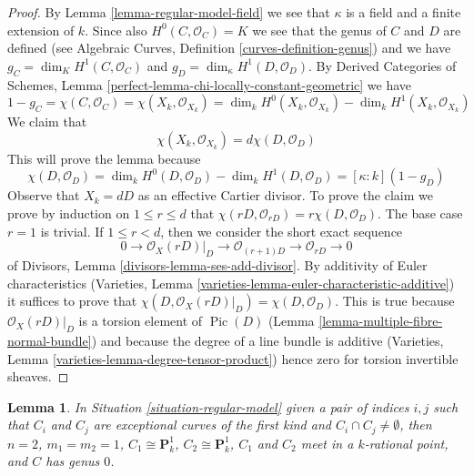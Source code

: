 \documentclass{stacks-project}
\theoremstyle{plain}
\newtheorem{lemma}[subsection]{Lemma}
\theoremstyle{definition}
\theoremstyle{remark}
\numberwithin{equation}{subsection}
\def\Pic{\mathop{\mathrm{Pic}}\nolimits}
\begin{document}
\begin{proof}
By Lemma \ref{lemma-regular-model-field} we see that $\kappa$ is a field
and a finite extension of $k$. Since also $H^0(C, \mathcal{O}_C) = K$
we see that the genus of $C$ and $D$ are defined (see
Algebraic Curves, Definition \ref{curves-definition-genus}) and
we have $g_C = \dim_K H^1(C, \mathcal{O}_C)$ and
$g_D = \dim_\kappa H^1(D, \mathcal{O}_D)$.
By Derived Categories of Schemes, Lemma
\ref{perfect-lemma-chi-locally-constant-geometric}
we have
$$
1 - g_C = \chi(C, \mathcal{O}_C) =
\chi(X_k, \mathcal{O}_{X_k}) = \dim_k H^0(X_k, \mathcal{O}_{X_k})
- \dim_k H^1(X_k, \mathcal{O}_{X_k})
$$
We claim that
$$
\chi(X_k, \mathcal{O}_{X_k}) = d \chi(D, \mathcal{O}_D)
$$
This will prove the lemma because
$$
\chi(D, \mathcal{O}_D) =
\dim_k H^0(D, \mathcal{O}_D) - \dim_k H^1(D, \mathcal{O}_D) =
[\kappa : k](1 - g_D)
$$
Observe that $X_k = dD$ as an effective Cartier divisor.
To prove the claim we prove by induction on $1 \leq r \leq d$ that
$\chi(rD, \mathcal{O}_{rD}) = r \chi(D, \mathcal{O}_D)$.
The base case $r = 1$ is trivial. If $1 \leq r < d$, then we consider
the short exact sequence
$$
0 \to \mathcal{O}_X(rD)|_D \to \mathcal{O}_{(r + 1)D} \to
\mathcal{O}_{rD} \to 0
$$
of Divisors, Lemma \ref{divisors-lemma-ses-add-divisor}. By additivity
of Euler characteristics
(Varieties, Lemma \ref{varieties-lemma-euler-characteristic-additive})
it suffices to prove that
$\chi(D, \mathcal{O}_X(rD)|_D) = \chi(D, \mathcal{O}_D)$.
This is true because $\mathcal{O}_X(rD)|_D$ is a torsion
element of $\Pic(D)$ (Lemma \ref{lemma-multiple-fibre-normal-bundle})
and because the degree of a line bundle is additive
(Varieties, Lemma \ref{varieties-lemma-degree-tensor-product})
hence zero for torsion invertible sheaves.
\end{proof}

\begin{lemma}
\label{lemma-exceptional-curves-dont-meet}
In Situation \ref{situation-regular-model} given a pair of indices $i, j$
such that $C_i$ and $C_j$ are exceptional curves of the first kind
and $C_i \cap C_j \not = \emptyset$, then
$n = 2$, $m_1 = m_2 = 1$, $C_1 \cong \mathbf{P}^1_k$,
$C_2 \cong \mathbf{P}^1_k$, $C_1$ and $C_2$ meet in a $k$-rational point,
and $C$ has genus $0$.
\end{lemma}
\end{document}
